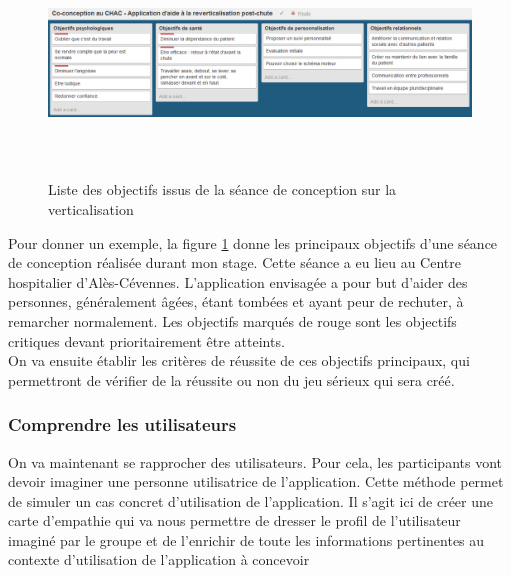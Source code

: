 \documentclass[french, 12pt]{article} %
\begin{document}
\begin{figure}[h]
	\centering
	\includegraphics[width = 16cm, height=6cm]{images/objectifs_ales.png}
	\caption{Liste des objectifs issus de la séance de conception sur la verticalisation}
	\label{objectifs_ales}
\end{figure}

Pour donner un exemple, la figure \ref{objectifs_ales} donne les principaux objectifs d'une séance de conception réalisée durant mon stage. Cette séance a eu lieu au Centre hospitalier d'Alès-Cévennes. L'application envisagée a pour but d'aider des personnes, généralement âgées, étant tombées et ayant peur de rechuter, à remarcher normalement. Les objectifs marqués de rouge sont les objectifs critiques devant prioritairement être atteints. \\
On va ensuite établir les critères de réussite de ces objectifs principaux, qui permettront de vérifier de la réussite ou non du jeu sérieux qui sera créé.
 
\subsubsection*{Comprendre les utilisateurs}
On va maintenant se rapprocher des utilisateurs. Pour cela, les participants vont devoir imaginer une personne utilisatrice de l'application. Cette méthode permet de simuler un cas concret d'utilisation de l'application. Il s'agit ici de créer une carte d'empathie qui va nous permettre de dresser le profil de l'utilisateur imaginé par le groupe et de l'enrichir de toute les informations pertinentes au contexte d'utilisation de l'application à concevoir
\end{document}
